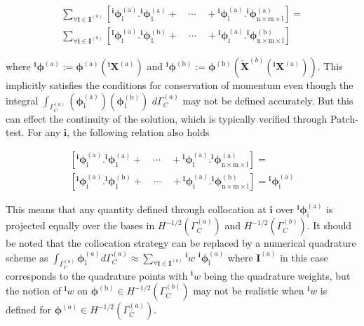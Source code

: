 \begin{multline}\label{sum_part_unity}
\sum_{\forall \bm i \in \bm I^{(a)}} [{}^{\bm i} \bm  \phi^{\mathrm{(a)}}_{\mathrm{i}}.{}^{\bm i} \bm  \phi^{\mathrm{(a)}}_{\mathrm{1}} +\quad \cdots \quad  +{}^{\bm i} \bm  \phi^{\mathrm{(a)}}_{\mathrm{i}}. {}^{\bm i} \bm  \phi^{\mathrm{(a)}}_{\mathrm{n \times m \times l}}]=\\
\sum_{\forall \bm i \in \bm I^{(a)}} [{}^{\bm i} \bm  \phi^{\mathrm{(a)}}_{\mathrm{i}}.{}^{\bm i} \bm  \phi^{\mathrm{(b)}}_{\mathrm{1}} +\quad \cdots \quad  +{}^{\bm i} \bm  \phi^{\mathrm{(a)}}_{\mathrm{i}}. {}^{\bm i} \bm  \phi^{\mathrm{(b)}}_{\mathrm{n \times m \times l}} ] 
\end{multline}    

where ${}^{\bm i} \bm  \phi^{\mathrm{(a)}}:= \bm  \phi^{\mathrm{(a)}}({}^{\bm i} \bm X^{\mathrm{(a)}})$ and  ${}^{\bm i} \bm  \phi^{\mathrm{(b)}}:= \bm  \phi^{\mathrm{(b)}}(\overleftarrow{\bm X}^{(b)}({}^{\bm i} \bm X^{\mathrm{(a)}}))$. 
This implicitly satisfies the conditions for conservation of momentum even though the integral $\int_{\Gamma^{(a)}_C} (\bm  \phi^{\mathrm{(a)}}_{\mathrm{i}})(\bm  \phi^{\mathrm{(b)}}_{\mathrm{1}})\,\, d\Gamma^{(a)}_C$ may not be defined accurately. But this can effect the continuity of the solution, which is typically verified through Patch-test. For any $\bm i$, the following relation also holds

\begin{multline}\label{part_unity}
 [{}^{\bm i} \bm  \phi^{\mathrm{(a)}}_{\mathrm{i}}.{}^{\bm i} \bm  \phi^{\mathrm{(a)}}_{\mathrm{1}} +\quad \cdots \quad  +{}^{\bm i} \bm  \phi^{\mathrm{(a)}}_{\mathrm{i}}.{}^{\bm i} \bm  \phi^{\mathrm{(a)}}_{\mathrm{n \times m \times l}}]=\\
 [{}^{\bm i} \bm  \phi^{\mathrm{(a)}}_{\mathrm{i}}.{}^{\bm i} \bm  \phi^{\mathrm{(b)}}_{\mathrm{1}} +\quad \cdots \quad  +{}^{\bm i} \bm  \phi^{\mathrm{(a)}}_{\mathrm{i}}.{}^{\bm i} \bm  \phi^{\mathrm{(b)}}_{\mathrm{n \times m \times l}} ] = {}^{\bm i} \bm  \phi^{\mathrm{(a)}}_{\mathrm{i}}
\end{multline}    

This means that any quantity defined through collocation at $\bm i$ over ${}^{\bm i} \bm  \phi^{\mathrm{(a)}}_{\mathrm{i}}$ is projected equally over the bases in $H^{-1/2}(\Gamma^{(a)}_C)$ and $H^{-1/2}(\Gamma^{(b)}_C)$. It should be noted that the collocation strategy  can be replaced by a numerical quadrature scheme as $\int_{\Gamma_C^{(a)}} \bm \phi_{\mathrm i}^{(a)} d {\Gamma_C^{(a)}}  \approx \sum_{\forall \bm i \in \bm I^{(a)}} {}^{\bm i}w \,\,  {}^{\bm i}\bm \phi_{\mathrm i}^{(a)}$ where $\bm I^{(a)}$ in this case corresponds to the quadrature points with ${}^{\bm i}w$ being the quadrature weights, but the notion of ${}^{\bm i} w$ on $\bm  \phi^{\mathrm{(b)}} \in H^{-1/2}(\Gamma^{(b)}_C)$ may not be realistic when ${}^{\bm i} w$ is defined for $\bm \phi^{(a)} \in H^{-1/2}(\Gamma^{(a)}_C)$.\\

